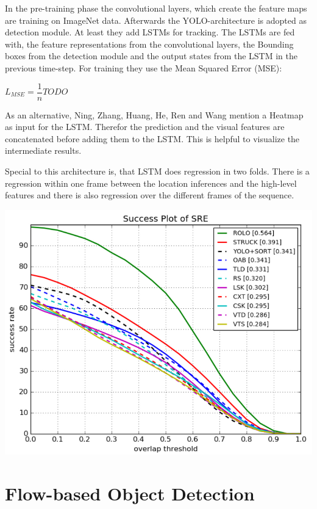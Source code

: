 \documentclass[conference]{IEEEtran}
\begin{document}
In the pre-training phase the convolutional layers, which create the feature maps are training on ImageNet data. Afterwards the YOLO-architecture is adopted as detection module. At least they add LSTMs for tracking. The LSTMs are fed with, the feature representations from the convolutional layers, the Bounding boxes from the detection module and the output states from the LSTM in the previous time-step. For training they use the Mean Squared Error (MSE): \newline

$ L_{MSE} = \dfrac{1}{n} TODO $ \newline

As an alternative, Ning, Zhang, Huang, He, Ren and Wang mention a Heatmap as  input for the LSTM. Therefor the prediction and the visual features are concatenated before adding them to the LSTM. This is helpful to visualize the intermediate results. \newline

Special to this architecture is, that LSTM does regression in two folds. There is a regression within one frame between the location inferences and the high-level features and there is also regression over the different frames of the sequence. \newline

\includegraphics[width=\columnwidth]{otb-challenge-results} \newline

\section{Flow-based Object Detection}
\end{document}

